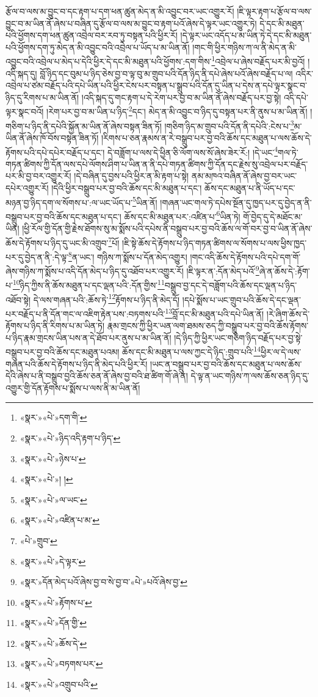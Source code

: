 རྩོལ་བ་ལས་མ་བྱུང་བ་དང་རྟག་པ་དག་ཕན་ཚུན་མེད་ན་མི་འབྱུང་བར་ཡང་འགྱུར་རོ། །ཇི་ལྟར་རྟག་པ་རྩོལ་བ་ལས་བྱུང་བ་མ་ཡིན་ནོ་ཞེས་པ་བཞིན་དུ་རྩོལ་བ་ལས་མ་བྱུང་བ་རྟག་པའོ་ཞེས་དེ་ལྟར་ཡང་འགྱུར་ཏེ། དེ་དང་མི་མཐུན་པའི་ཕྱོགས་དག་ཕན་ཚུན་འབྲེལ་བར་རབ་ཏུ་བསྟན་པའི་ཕྱིར་རོ། །དེ་ལྟར་ཡང་འདོད་པ་མ་ཡིན་ཏེ་དེ་དང་མི་མཐུན་པའི་ཕྱོགས་དག་ཏུ་མེད་ན་མི་འབྱུང་བའི་འབྲེལ་པ་ཡོད་པ་མ་ཡིན་ནོ། །གང་གི་ཕྱིར་གཉིས་ཀ་ལ་ནི་མེད་ན་མི་འབྱུང་བའི་འབྲེལ་པ་མེད་པ་དེའི་ཕྱིར་དེ་དང་མི་མཐུན་པའི་ཕྱོགས་:དག་གིས་\footnote{«སྣར་»«པེ་»དག་གི་}འབྲེལ་པ་ཞེས་བརྗོད་པར་མི་བྱའོ། །འདི་སྐད་དུ། བློ་ཉིད་དང་བུམ་པ་ཉིད་ཅེས་བྱ་བ་ལྟ་བུ་མ་གྲུབ་པའི་དོན་ཉིད་ནི་དཔེ་ཞེས་པའོ་ཞེས་བརྗོད་པ་ལ། འདིར་འབྲེལ་པ་ཙམ་བརྗོད་པའི་དཔེ་ཡིན་པའི་ཕྱིར་ངེས་པར་བསྟན་པ་སྒྲུབ་པའི་དོན་དུ་ཡིན་པ་དེས་ན་དཔེ་ལྟར་སྣང་བ་ཉིད་དུ་རིགས་པ་མ་ཡིན་ནོ། །འདི་སྐད་དུ་གང་རྟག་པ་དེ་རེག་པར་བྱ་བ་མ་ཡིན་ནོ་ཞེས་བརྗོད་པར་བྱ་སྟེ། འདི་དཔེ་ལྟར་སྣང་བའོ། །རེག་པར་བྱ་བ་མ་ཡིན་པ་ཉིད་\footnote{«སྣར་»«པེ་»ཉིད་འདི་རྟག་པ་ཉིད་}དང་། མེད་ན་མི་འབྱུང་བ་ཉིད་དུ་བསྟན་པར་ནི་ནུས་པ་མ་ཡིན་ནོ། །གཅིག་པ་ཉིད་ནི་དཔེའི་སྐྱོན་མ་ཡིན་ནོ་ཞེས་བསྟན་ཟིན་ཏོ། །གཅིག་ཉིད་མ་གྲུབ་པའི་དོན་ནི་དཔེའི་:ངེས་པ་\footnote{«སྣར་»«པེ་»ཉེས་པ་}མ་ཡིན་ནོ་ཞེས་ཁོ་བོས་བསྟན་ཟིན་ཏོ། །རིགས་པ་ཅན་རྣམས་ན་རེ་བསྒྲུབ་པར་བྱ་བའི་ཆོས་དང་མཐུན་པ་ལས་ཆོས་དེ་རྟོགས་པའི་དཔེ་དཔེར་བརྗོད་པ་དང་། དེ་བཟློག་པ་ལས་དེ་ཕྱིན་ཅི་ལོག་ལས་སོ་ཞེས་ཟེར་རོ:། །དེ་ཡང་\footnote{«སྣར་»«པེ་»། །}གལ་ཏེ་གཏན་ཚིགས་ཀྱི་དོན་ལས་དཔེ་ལོགས་ཤིག་པ་ཡིན་ན་ནི་དཔེ་གཏན་ཚིགས་ཀྱི་དོན་དང་རྗེས་སུ་འབྲེལ་པར་བརྗོད་པར་མི་བྱ་བར་འགྱུར་རོ། །དེ་བཞིན་དུ་བྱས་པའི་ཕྱིར་ན་མི་རྟག་པ་སྟེ། ནམ་མཁའ་བཞིན་ནོ་ཞེས་བྱ་བར་ཡང་དཔེར་འགྱུར་རོ། །དེའི་ཕྱིར་བསྒྲུབ་པར་བྱ་བའི་ཆོས་དང་མི་མཐུན་པ་དང་། ཆོས་དང་མཐུན་པ་ནི་ཡོད་པ་དང་མཉན་བྱ་ཉིད་དག་ལ་སོགས་པ་:ལ་ཡང་ཡོད་པ་\footnote{«སྣར་»«པེ་»ལ་ཡང་}ཡིན་ནོ། །གཞན་ཡང་གལ་ཏེ་དཔེས་སྔོན་དུ་ཁྱད་པར་དུ་བྱེད་ན་ནི་བསྒྲུབ་པར་བྱ་བའི་ཆོས་དང་མཐུན་པ་དང་། ཆོས་དང་མི་མཐུན་པར་:འཛིན་པ་\footnote{«སྣར་»«པེ་»འཛིན་པ་མ་}ཡིན་ཏེ། གོ་བྱེད་དུ་དེ་མཐོང་མ་ཡིན། །ཕྱི་རོལ་གྱི་དོན་གྱི་རྗེས་ཐོགས་སུ་མ་སྨོས་པའི་དཔེས་ནི་བསྒྲུབ་པར་བྱ་བའི་ཆོས་ལ་གོ་བར་བྱ་བ་ཡིན་ནོ་ཞེས་ཆོས་དེ་རྟོགས་པ་ཉིད་དུ་ཡང་མི་འགྲུབ་\footnote{«པེ་»གྲུབ་}པོ། །ཇི་སྟེ་ཆོས་དེ་རྟོགས་པ་ཉིད་གཏན་ཚིགས་ལ་སོགས་པ་ལས་ཕྱིས་ཁྱད་པར་དུ་བྱེད་ན་ནི་:དེ་ལྟ་\footnote{«སྣར་»«པེ་»དེ་ལྟར་}ན་ཡང་། གཉིས་ཀ་སྨོས་པ་དོན་མེད་འགྱུར། །གང་འདི་ཆོས་དེ་རྟོགས་པའི་དཔེ་དག་གོ་ཞེས་གཉིས་ཀ་སྨོས་པ་འདི་དོན་མེད་པ་ཉིད་དུ་འཐོབ་པར་འགྱུར་རོ། །ཇི་ལྟར་ན་:དོན་མེད་པའོ་\footnote{«སྣར་»དོན་མེད་པའོ་ཞེས་བྱ་བ་ེས་བྱ་བ་«པེ་»པའོ་ཞེས་བྱ་}ཞེ་ན་ཆོས་དེ་:རྟོག་པ་\footnote{«སྣར་»«པེ་»རྟོགས་པ་}ཉིད་ཀྱིས་ནི་ཆོས་མཐུན་པ་དང་ལྡན་པའི་:དོན་གྱིས་\footnote{«སྣར་»«པེ་»དོན་གྱི་}བསྒྲུབ་བྱ་དང་དེ་བཟློག་པའི་ཆོས་དང་ལྡན་པ་ཉིད་འཐོབ་སྟེ། དེ་ལས་གཞན་པའི་:ཆོས་ཏེ་\footnote{«སྣར་»«པེ་»ཆོས་དེ་}རྟོགས་པ་ཉིད་ནི་མེད་དོ། །དཔེ་སྨོས་པ་ཡང་གྲུབ་པའི་ཆོས་དེ་དང་ལྡན་པར་བརྗོད་པ་ནི་དོན་གང་ལ་འཇིག་རྟེན་པས་:བཏགས་པའི་\footnote{«སྣར་»«པེ་»བཏགས་པར་}བློ་དང་མི་མཐུན་པའི་དཔེ་ཡིན་ནོ། །རེ་ཞིག་ཆོས་དེ་རྟོགས་པ་ཉིད་ནི་རིགས་པ་མ་ཡིན་ཏེ། རྣམ་གྲངས་ཀྱི་ཕྱིར་ཡན་ལག་ཐམས་ཅད་ཀྱི་བསྒྲུབ་པར་བྱ་བའི་ཆོས་རྟོགས་པ་ཉིད་རྣམ་གྲངས་ཡིན་པས་ན་དེ་ཐོབ་པར་ནུས་པ་མ་ཡིན་ནོ། །དེ་ཉིད་ཀྱི་ཕྱིར་ཡང་གཅིག་ཉིད་བརྗོད་པར་བྱ་སྟེ་བསྒྲུབ་པར་བྱ་བའི་ཆོས་དང་མཐུན་པའམ། ཆོས་དང་མི་མཐུན་པ་ལས་ཀྱང་དེ་ཉིད་:གྲུབ་པའི་\footnote{«སྣར་»«པེ་»འགྲུབ་པའི་}ཕྱིར་ལ་དེ་ལས་གཞན་པའི་ཆོས་དེ་རྟོགས་པ་ཉིད་ནི་མེད་པའི་ཕྱིར་རོ། །ཡང་ན་བསྒྲུབ་པར་བྱ་བའི་ཆོས་དང་མཐུན་པ་ལས་ཆོས་དེའི་ཞེས་པ་ནི་བསྒྲུབ་བྱའི་ཆོས་ཅན་ནོ་ཞེས་བྱ་བའི་ཐ་ཚིག་གོ་ཞེ་ན། དེ་ལྟ་ན་ཡང་གཉིས་ཀ་ལས་ཆོས་ཅན་ཉིད་དུ་འགྱུར་གྱི་དོན་རྟོགས་པ་སྨོས་པ་ལས་ནི་མ་ཡིན་ནོ། 